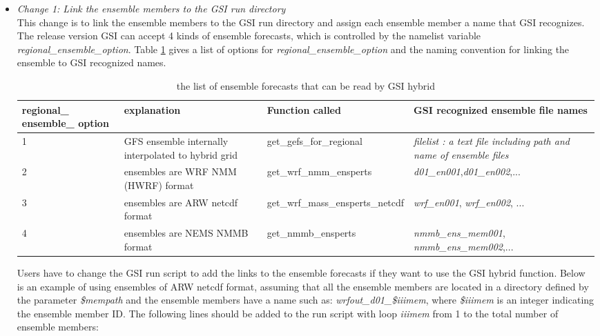 \begin{itemize}[leftmargin=*]
\item \textit{Change 1: Link the ensemble members to the GSI run directory}\\

This change is to link the ensemble members to the GSI run directory and assign each ensemble member a name that GSI recognizes. The release version GSI can accept 4 kinds of ensemble forecasts, which is controlled by the namelist variable \textit{regional\_ensemble\_option}. Table \ref{tab51} gives a list of options for \textit{regional\_ensemble\_option} and the naming convention for linking the ensemble to GSI recognized names. \\


\begin{table}[htbp]
\centering
\begin{small}
\caption{the list of ensemble forecasts that can be read by GSI hybrid}
\begin{tabular}{|p{1.7cm}|p{4cm}|p{4.6cm}|p{4cm}|}
\hline
\hline
regional\_ ensemble\_ option & explanation & Function called & GSI recognized  ensemble file names \\
\hline
1 & GFS ensemble internally interpolated to hybrid grid & get\_gefs\_for\_regional & \textit{filelist : a text file including path and name of ensemble files} \\
\hline
2 & ensembles are WRF NMM (HWRF) format & get\_wrf\_nmm\_ensperts & 
\textit{d01\_en001},\newline \textit{d01\_en002},\newline ... \\
\hline
3 & ensembles are ARW netcdf format	& get\_wrf\_mass\_ensperts\_netcdf & 
\textit{wrf\_en001}, \newline 
\textit{wrf\_en002}, \newline ... \\
\hline
4 & ensembles are NEMS NMMB format & get\_nmmb\_ensperts &
 \textit{nmmb\_ens\_mem001},\newline
  \textit{nmmb\_ens\_mem002},\newline ...\\
\hline
\end{tabular}
\label{tab51}
\end{small}
\end{table} 


Users have to change the GSI run script to add the links to the ensemble forecasts if they want to use the GSI hybrid function. Below is an example of using ensembles of ARW netcdf format, assuming that all the ensemble members are located in a directory defined by the parameter \textit{\${mempath}} and the ensemble members have a name such as: \textit{wrfout\_d01\_\${iiimem}}, where \textit{\${iiimem}} is an integer indicating the ensemble member ID. The following lines should be added to the run script with loop \textit{iiimem} from 1 to the total number of ensemble members:


\end{itemize}
